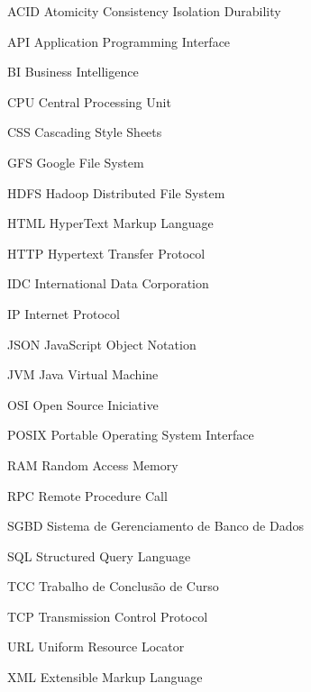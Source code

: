 \begin{siglas}

  \item[ACID] Atomicity Consistency Isolation Durability
  \item[API] Application Programming Interface
  \item[BI] Business Intelligence
  \item[CPU] Central Processing Unit
  \item[CSS] Cascading Style Sheets
  \item[GFS] Google File System
  \item[HDFS] Hadoop Distributed File System
  \item[HTML] HyperText Markup Language
  \item[HTTP] Hypertext Transfer Protocol
  \item[IDC] International Data Corporation
  \item[IP] Internet Protocol
  \item[JSON] JavaScript Object Notation
  \item[JVM] Java Virtual Machine
  \item[OSI] Open Source Iniciative
  \item[POSIX] Portable Operating System Interface
  \item[RAM] Random Access Memory
  \item[RPC] Remote Procedure Call
  \item[SGBD] Sistema de Gerenciamento de Banco de Dados
  \item[SQL] Structured Query Language
  \item[TCC] Trabalho de Conclusão de Curso
  \item[TCP] Transmission Control Protocol
  \item[URL] Uniform Resource Locator
  \item[XML] Extensible Markup Language

\end{siglas}

